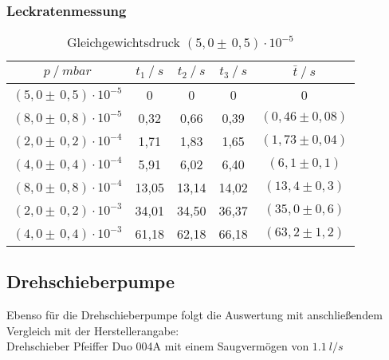 \subsubsection{Leckratenmessung}
\begin{table}[H]
\centering
\label{tab:leck_Dreh1}
\begin{tabular}{c|c|c|c|c}
	{$p \:/\: \si{mbar}$} & {$t_1 \:/\: \si{s} $} & {$t_2 \:/\: \si{s} $} & {$t_3 \:/\: \si{s} $} & {$\bar{t} \:/\: \si{s}$}\\
\midrule
$(5,0 \pm \, 0,5)\cdot 10^{-5}$ &0 &0 &0 &0\\
$(8,0 \pm \, 0,8)\cdot 10^{-5}$ &   0,32 &  0,66 &  0,39 & $(0,46 \pm 0,08)$\\
$(2,0 \pm \, 0,2)\cdot 10^{-4}$ &   1,71  &  1,83 &  1,65 & $(1,73 \pm 0,04) $\\
$(4,0 \pm \, 0,4)\cdot 10^{-4}$ &   5,91 &  6,02 &  6,40 & $(6,1 \pm 0,1) $\\
$(8,0 \pm \, 0,8)\cdot 10^{-4}$  &   13,05 &  13,14 &  14,02 & $(13,4 \pm 0,3) $\\
$(2,0 \pm \, 0,2)\cdot 10^{-3}$ &   34,01 &  34,50 &  36,37 & $(35,0 \pm 0,6) $\\
$(4,0 \pm \, 0,4)\cdot 10^{-3}$ &  61,18 & 62,18 & 66,18 & $(63,2 \pm 1,2) $\\
\end{tabular}
\caption{Gleichgewichtsdruck $(5,0 \pm \, 0,5)\cdot 10^{-5}$}
\end{table}






\subsection{Drehschieberpumpe}
Ebenso für die Drehschieberpumpe folgt die Auswertung mit anschließendem Vergleich mit der
Herstellerangabe:\\
Drehschieber Pfeiffer Duo 004A mit einem Saugvermögen von $\SI{1,1}{l/s}$
